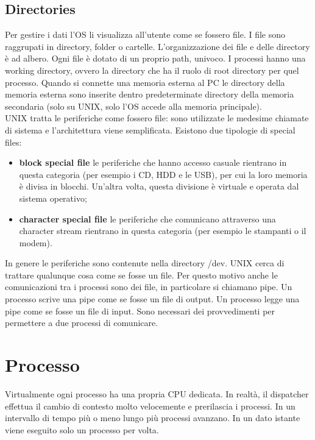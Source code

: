 \documentclass{article}
\begin{document}
\subsection{Directories}
Per gestire i dati l'OS li visualizza all'utente come se fossero file. I file sono raggrupati in directory, folder o cartelle. L'organizzazione dei file e delle directory è ad albero. Ogni file è dotato di un proprio path, univoco. I processi hanno una working directory, ovvero la directory che ha il ruolo di root directory per quel processo. Quando si connette una memoria esterna al PC le directory della memoria esterna sono inserite dentro predeterminate directory della memoria secondaria (solo su UNIX, solo l'OS accede alla memoria principale).\\

UNIX tratta le periferiche come fossero file: sono utilizzate le medesime chiamate di sistema e l'architettura viene semplificata.
Esistono due tipologie di special files:
\begin{itemize}
  \item \textbf{block special file} le periferiche che hanno accesso casuale rientrano in questa categoria (per esempio i CD, HDD e le USB), per cui la loro memoria è divisa in blocchi. Un'altra volta, questa divisione è virtuale e operata dal sistema operativo;

  \item \textbf{character special file} le periferiche che comunicano attraverso una character stream rientrano in questa categoria (per esempio le stampanti o il modem).
\end{itemize}

In genere le periferiche sono contenute nella directory /dev. UNIX cerca di trattare qualunque cosa come se fosse un file. Per questo motivo anche le comunicazioni tra i processi sono dei file, in particolare si chiamano pipe. Un processo scrive una pipe come se fosse un file di output. Un processo legge una pipe come se fosse un file di input. Sono necessari dei provvedimenti per permettere a due processi di comunicare.

\section{Processo}
Virtualmente ogni processo ha una propria CPU dedicata. In realtà, il dispatcher effettua il cambio di contesto molto velocemente e prerilascia i processi. In un intervallo di tempo più o meno lungo più processi avanzano. In un dato istante viene eseguito solo un processo per volta.
\end{document}
